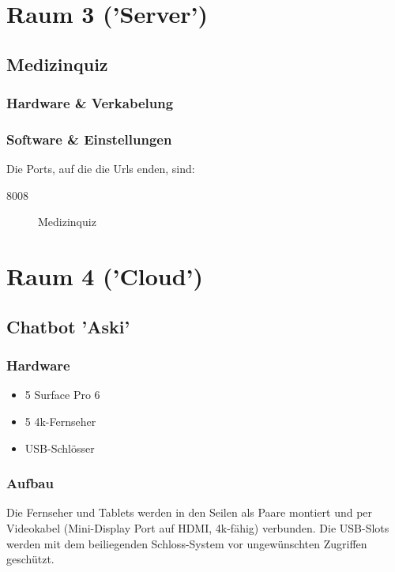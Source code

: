 \documentclass [titlepage,a4paper]{article}
\begin{document}
\newpage
\section{Raum 3 ('Server')}

\subsection{Medizinquiz}

\subsubsection{Hardware \& Verkabelung}

\subsubsection{Software \& Einstellungen}

Die Ports, auf die die Urls enden, sind: \begin{description}
    \item[8008] Medizinquiz
\end{description}

\newpage
\section{Raum 4 ('Cloud')}

\subsection{Chatbot 'Aski'}

\subsubsection{Hardware}

\begin{itemize}
\item 5 Surface Pro 6
\item 5 4k-Fernseher
\item USB-Schlösser
\end{itemize}

\subsubsection{Aufbau}

Die Fernseher und Tablets werden in den Seilen als Paare montiert und per Videokabel (Mini-Display Port auf HDMI, 4k-fähig) verbunden. Die USB-Slots werden mit dem beiliegenden Schloss-System vor ungewünschten Zugriffen geschützt.
\end{document}
